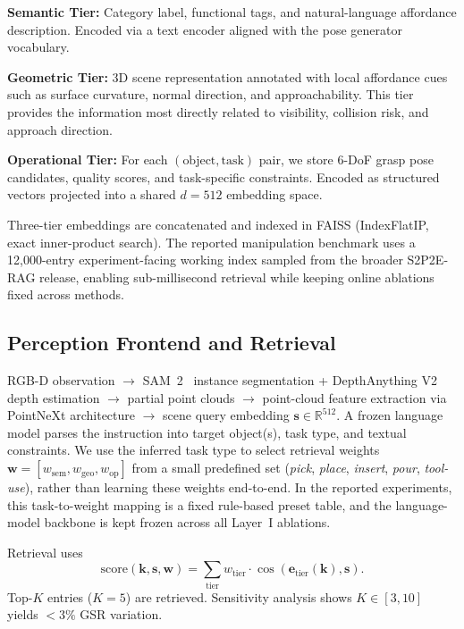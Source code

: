 \documentclass[12pt]{article}
\begin{document}
\textbf{Semantic Tier:} Category label, functional tags, and natural-language affordance description. Encoded via a text encoder aligned with the pose generator vocabulary.

\textbf{Geometric Tier:} 3D scene representation annotated with local affordance cues such as surface curvature, normal direction, and approachability. This tier provides the information most directly related to visibility, collision risk, and approach direction.

\textbf{Operational Tier:} For each $(\text{object}, \text{task})$ pair, we store 6-DoF grasp pose candidates, quality scores, and task-specific constraints. Encoded as structured vectors projected into a shared $d=512$ embedding space.

Three-tier embeddings are concatenated and indexed in FAISS (IndexFlatIP, exact inner-product search). The reported manipulation benchmark uses a 12,000-entry experiment-facing working index sampled from the broader S2P2E-RAG release, enabling sub-millisecond retrieval while keeping online ablations fixed across methods.

\subsection{Perception Frontend and Retrieval}

RGB-D observation $\rightarrow$ SAM~2~\cite{ravi2024sam2} instance segmentation + DepthAnything V2~\cite{yang2024depthanythingv2} depth estimation $\rightarrow$ partial point clouds $\rightarrow$ point-cloud feature extraction via PointNeXt architecture $\rightarrow$ scene query embedding $\mathbf{s} \in \mathbb{R}^{512}$. A frozen language model parses the instruction into target object(s), task type, and textual constraints. We use the inferred task type to select retrieval weights $\mathbf{w} = [w_{\mathrm{sem}}, w_{\mathrm{geo}}, w_{\mathrm{op}}]$ from a small predefined set (\emph{pick}, \emph{place}, \emph{insert}, \emph{pour}, \emph{tool-use}), rather than learning these weights end-to-end. In the reported experiments, this task-to-weight mapping is a fixed rule-based preset table, and the language-model backbone is kept frozen across all Layer~I ablations.

Retrieval uses
\[
\mathrm{score}(\mathbf{k}, \mathbf{s}, \mathbf{w}) =
\sum_{\mathrm{tier}} w_{\mathrm{tier}} \cdot
\cos(\mathbf{e}_{\mathrm{tier}}(\mathbf{k}), \mathbf{s}).
\]
Top-$K$ entries ($K=5$) are retrieved. Sensitivity analysis shows $K\in[3,10]$ yields $<3\%$ GSR variation.
\end{document}
